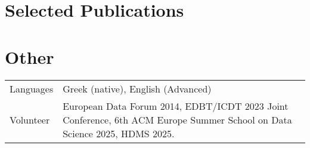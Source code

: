 \documentclass[a4paper,12pt]{article}
\begin{document}




\section{Selected Publications}


\begin{refsection}
	\setlength\bibitemsep{0.5em}
	\nocite{*}
	\printbibliography[heading=none]
\end{refsection}



\section{Other}
\begin{tabularx}{\linewidth}{@{}l X@{}}
	Languages
	&  \normalsize{Greek (native), English (Advanced)	}\\
	
	
	
	
	Volunteer	&  \normalsize{European Data Forum 2014, EDBT/ICDT 2023 Joint Conference, 6th ACM Europe Summer School on Data Science 2025, HDMS 2025.
		
	}\\ 
\end{tabularx}
\end{document}
